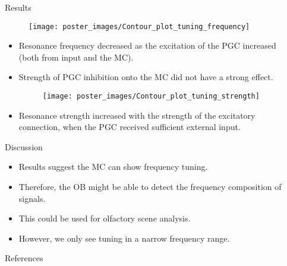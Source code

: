 \documentclass[final,hyperref={pdfpagelabels=false}]{beamer}
\begin{document}
\begin{frame}{}
\begin{columns}[t]
\begin{column}{.48\linewidth}
\end{column}
\begin{column}{.48\linewidth}

\begin{block}{Results}
\begin{figure}
\center
\texttt{[image: poster\_images/Contour\_plot\_tuning\_frequency]}
\end{figure}

\begin{itemize}
\item Resonance frequency decreased as the excitation of the PGC increased (both from input and the MC).
\item Strength of PGC inhibition onto the MC did not have a strong effect.

\begin{figure}
\center
\texttt{[image: poster\_images/Contour\_plot\_tuning\_strength]}
\end{figure} 

\item Resonance strength increased with the strength of the excitatory connection, when the PGC received sufficient external input.
\end{itemize}
\end{block}

\begin{block}{Discussion}
\begin{itemize}
\item Results suggest the MC can show frequency tuning.
\item Therefore, the OB might be able to detect the frequency composition of signals.
\item This could be used for olfactory scene analysis.
\item However, we only see tuning in a narrow frequency range.
\end{itemize}
\end{block}

\begin{block}{References}
\nocite{*}

{\footnotesize
}
\end{block}

\end{column}
\end{columns}
\end{frame}
\end{document}
